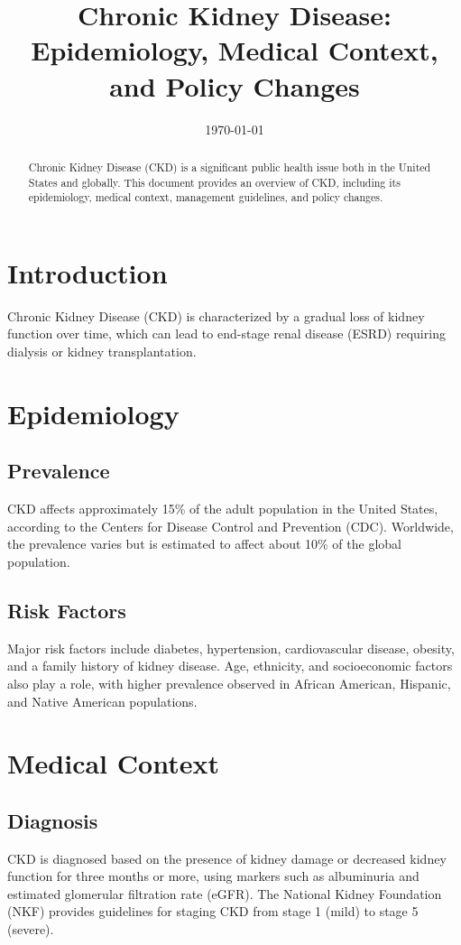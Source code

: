 \documentclass{article}
\title{Chronic Kidney Disease: Epidemiology, Medical Context, and Policy Changes}
\author{}
\date{\today}
\begin{document}
\maketitle

\begin{abstract}
Chronic Kidney Disease (CKD) is a significant public health issue both in the United States and globally. This document provides an overview of CKD, including its epidemiology, medical context, management guidelines, and policy changes.
\end{abstract}

\section{Introduction}
Chronic Kidney Disease (CKD) is characterized by a gradual loss of kidney function over time, which can lead to end-stage renal disease (ESRD) requiring dialysis or kidney transplantation.

\section{Epidemiology}
\subsection{Prevalence}
CKD affects approximately 15\% of the adult population in the United States, according to the Centers for Disease Control and Prevention (CDC). Worldwide, the prevalence varies but is estimated to affect about 10\% of the global population.

\subsection{Risk Factors}
Major risk factors include diabetes, hypertension, cardiovascular disease, obesity, and a family history of kidney disease. Age, ethnicity, and socioeconomic factors also play a role, with higher prevalence observed in African American, Hispanic, and Native American populations.

\section{Medical Context}
\subsection{Diagnosis}
CKD is diagnosed based on the presence of kidney damage or decreased kidney function for three months or more, using markers such as albuminuria and estimated glomerular filtration rate (eGFR). The National Kidney Foundation (NKF) provides guidelines for staging CKD from stage 1 (mild) to stage 5 (severe).
\end{document}
